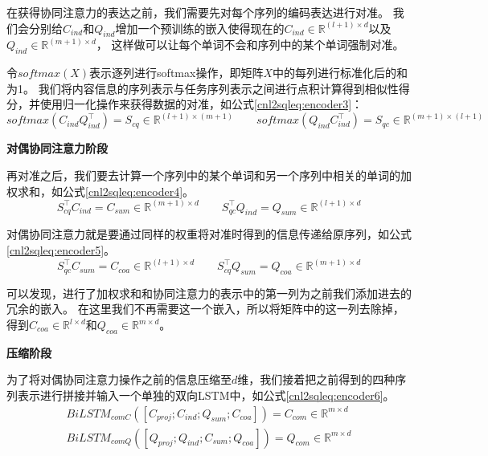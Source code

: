 在获得协同注意力的表达之前，我们需要先对每个序列的编码表达进行对准。
我们会分别给$C_{ind}$和$Q_{ind}$增加一个预训练的嵌入使得现在的$C_{ind} \in \mathbb{R}^{(l+1) \times d}$以及$Q_{ind} \in \mathbb{R}^{(m+1) \times d}$，
这样做可以让每个单词不会和序列中的某个单词强制对准。

令$softmax(X)$表示逐列进行softmax操作，即矩阵$X$中的每列进行标准化后的和为1。
我们将内容信息的序列表示与任务序列表示之间进行点积计算得到相似性得分，并使用归一化操作来获得数据的对准，如公式\ref{cnl2sqleq:encoder3}：
\begin{equation}
  \label{cnl2sqleq:encoder3}
  softmax(C_{ind}Q_{ind}^{\top}) = S_{cq} \in \mathbb{R}^{(l+1) \times (m+1)} \qquad softmax(Q_{ind}C_{ind}^{\top}) = S_{qc} \in \mathbb{R}^{(m+1) \times (l+1)}
\end{equation}

\textbf{对偶协同注意力阶段}

再对准之后，我们要去计算一个序列中的某个单词和另一个序列中相关的单词的加权求和，如公式\ref{cnl2sqleq:encoder4}。
\begin{equation}
  \label{cnl2sqleq:encoder4}
  S_{cq}^{\top}C_{ind} = C_{sum} \in \mathbb{R}^{(m+1) \times d} \qquad S_{qc}^{\top}Q_{ind} = Q_{sum} \in \mathbb{R}^{(l+1) \times d}
\end{equation}

对偶协同注意力就是要通过同样的权重将对准时得到的信息传递给原序列，如公式\ref{cnl2sqleq:encoder5}。
\begin{equation}
  \label{cnl2sqleq:encoder5}
  S_{qc}^{\top}C_{sum} = C_{coa} \in \mathbb{R}^{(l+1) \times d} \qquad S_{cq}^{\top}Q_{sum} = Q_{coa} \in \mathbb{R}^{(m+1) \times d}
\end{equation}

可以发现，进行了加权求和和协同注意力的表示中的第一列为之前我们添加进去的冗余的嵌入。
在这里我们不再需要这一个嵌入，所以将矩阵中的这一列去除掉，得到$C_{coa} \in \mathbb{R}^{l \times d}$和$Q_{coa} \in \mathbb{R}^{m \times d}$。

\textbf{压缩阶段}

为了将对偶协同注意力操作之前的信息压缩至$d$维，我们接着把之前得到的四种序列表示进行拼接并输入一个单独的双向LSTM中，如公式\ref{cnl2sqleq:encoder6}。
\begin{align}
  \label{cnl2sqleq:encoder6}
  BiLSTM_{comC}([C_{proj};C_{ind};Q_{sum};C_{coa}]) =  C_{com} \in \mathbb{R}^{m \times d}\\
  BiLSTM_{comQ}([Q_{proj};Q_{ind};C_{sum};Q_{coa}]) =  Q_{com} \in \mathbb{R}^{m \times d}
\end{align}


